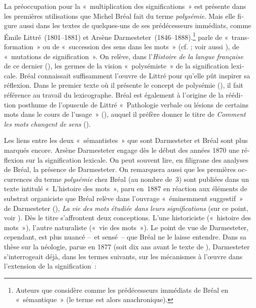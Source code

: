 \documentclass[output=paper]{langsci/langscibook}
\begin{document}
\begin{otherlanguage}{french}
La préoccupation pour la «~multiplication des significations~» est présente dans les premières utilisations que Michel Bréal fait du terme \textit{polysémie}. Mais elle figure aussi dans les textes de quelques-uns de ses prédécesseurs immédiats, comme Émile Littré~(1801--1881) et Arsène Darmesteter~(1846--1888).\footnote{Auteurs que \citet[1605]{nerlich_development_2001} considère comme les prédécesseurs immédiats de Bréal en «~sémantique~» (le terme est alors anachronique).} \citet[11--12]{darmesteter_traite_1874} parle de «~transformation~» ou de «~succession des sens dans les mots~» (cf. \citealt{darmesteter_sur_1876}; voir aussi \citealt{bailly_transformation_1874}), \citet[1]{littre_etudes_1880} de «~mutations de signification~». On relève, dans l’\textit{Histoire} \textit{de} \textit{la} \textit{langue} \textit{française} de ce dernier (\citealt{littre_histoire_1863}), les germes de la vision «~polysémiste~» de la signification lexicale. Bréal connaissait suffisamment l’œuvre de Littré pour qu’elle pût inspirer sa réflexion. Dans le premier texte où il présente le concept de polysémie (\citealt{breal_lhistoire_1887}), il fait référence au travail du lexicographe. Bréal est également à l’origine de la réédition posthume de l’opuscule de Littré «~Pathologie verbale ou lésions de certains mots dans le cours de l’usage~» (\citealt{littre_etudes_1880}), auquel il préfère donner le titre de \textit{Comment} \textit{les} \textit{mots} \textit{changent} \textit{de} \textit{sens} (\citealt{littre_comment_1888}).

Les liens entre les deux «~sémantistes~» que sont Darmesteter et Bréal sont plus marqués encore. Arsène Darmesteter engage dès le début des années 1870 une réflexion sur la signification lexicale. On peut souvent lire, en filigrane des analyses de Bréal, la présence de Darmesteter. On remarquera aussi que les premières occurrences du terme \textit{polysémie} chez Bréal (au nombre de~3) sont publiées dans un texte intitulé «~L’histoire des mots~», paru en~1887 en réaction aux éléments de substrat organiciste que Bréal relève dans l’ouvrage «~éminemment suggestif~» de Darmesteter (\citealt[469]{meyer_arsene_1888}), \textit{La} \textit{vie} \textit{des} \textit{mots} \textit{étudiée} \textit{dans} \textit{leurs} \textit{significations} (sur ce point, voir \citealt{delesalle_vie_1987}). Dès le titre s’affrontent deux conceptions. L’une historiciste («~histoire des mots~»), l’autre naturaliste («~vie des mots~»). Le point de vue de Darmesteter, cependant, est plus nuancé –~et sensé~– que Bréal ne le laisse entendre. Dans sa thèse sur la néologie, parue en 1877 (soit dix ans avant le texte de \citeauthor{breal_lhistoire_1887}), Darmesteter s’interrogeait déjà, dans les termes suivants, sur les mécanismes à l’œuvre dans l’extension de la signification~:


\end{otherlanguage}
\end{document}
